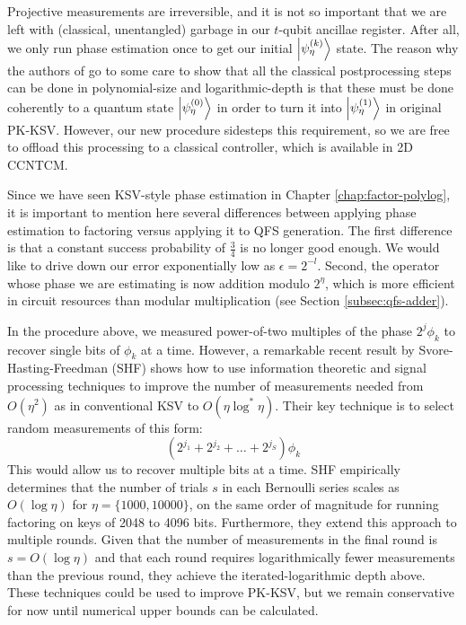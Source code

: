 Projective measurements are irreversible, and it is not so important that
we are left with (classical, unentangled) garbage in our $t$-qubit ancillae register.
After all, we only run phase estimation once
to get our initial $\left\vert{\psi_{\eta}^{(k)}}\right\rangle$ state.
The reason why
the authors of \cite{Kitaev2002} go to some care to show that all the classical
postprocessing steps can be done in polynomial-size and logarithmic-depth
is that these must be done coherently to a quantum state $\left\vert{\psi_{\eta}^{(0)}}\right\rangle$ in order
to turn it into $\left\vert{\psi_{\eta}^{(1)}}\right\rangle$ in original PK-KSV. However, our new procedure
sidesteps this requirement, so we are free to offload this processing to a
classical controller, which is available in \textsf{2D CCNTCM}.

Since we have seen KSV-style phase estimation in
Chapter \ref{chap:factor-polylog}, it is important to mention here several
differences between applying phase estimation to factoring versus
applying it to QFS generation. The first difference is that a constant
success probability of $\frac{3}{4}$ is no longer good enough. We would
like to drive down our error exponentially low as $\epsilon = 2^{-l}$.
Second, the operator whose phase we are estimating is now
addition modulo $2^{\eta}$, which is more efficient in circuit resources
than modular multiplication (see Section \ref{subsec:qfs-adder}).

In the procedure above, we measured power-of-two multiples of the phase
$2^{j}\phi_k$ to recover single bits of $\phi_k$ at a time.
However, a remarkable recent result by Svore-Hasting-Freedman (SHF) shows
how to use information theoretic and signal processing techniques to
improve the number of measurements needed from $O({\eta}^2)$ as in conventional
KSV to $O({\eta}\log^{*}{\eta})$.
Their key technique is to select random measurements of this form:
%
\begin{equation}
(2^{j_1}+2^{j_2}+\ldots + 2^{j_S})\phi_k
\end{equation}
%
This would allow us to recover multiple bits at a time.
SHF empirically determines that the number of trials $s$ in
each Bernoulli series scales as $O(\log {\eta})$ for ${\eta} = \{1000,10000\}$,
on the same order of magnitude for running factoring on
keys of 2048 to 4096 bits.
Furthermore, they extend this approach to multiple rounds. Given
that the number of measurements in the final round is
$s = O(\log {\eta})$ and that each round requires logarithmically
fewer measurements than the previous round, they
achieve the iterated-logarithmic depth above.
These techniques could be used to improve PK-KSV, but we
remain conservative for now until numerical upper bounds can be
calculated.

